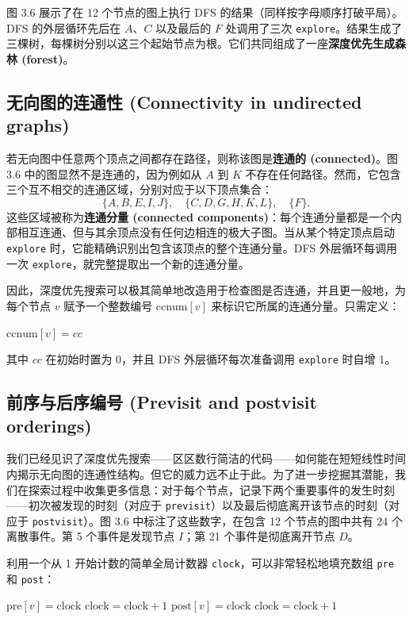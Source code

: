 图 3.6 展示了在 12 个节点的图上执行 DFS 的结果（同样按字母顺序打破平局）。DFS 的外层循环先后在 $A$、$C$ 以及最后的 $F$ 处调用了三次 \texttt{explore}。结果生成了三棵树，每棵树分别以这三个起始节点为根。它们共同组成了一座\textbf{深度优先生成森林 (forest)}。

\subsection{无向图的连通性 (Connectivity in undirected graphs)}
若无向图中任意两个顶点之间都存在路径，则称该图是\textbf{连通的 (connected)}。图 3.6 中的图显然不是连通的，因为例如从 $A$ 到 $K$ 不存在任何路径。然而，它包含三个互不相交的连通区域，分别对应于以下顶点集合：
\[
\{A, B, E, I, J\}, \quad \{C, D, G, H, K, L\}, \quad \{F\}.
\]
这些区域被称为\textbf{连通分量 (connected components)}：每个连通分量都是一个内部相互连通、但与其余顶点没有任何边相连的极大子图。当从某个特定顶点启动 \texttt{explore} 时，它能精确识别出包含该顶点的整个连通分量。DFS 外层循环每调用一次 \texttt{explore}，就完整提取出一个新的连通分量。

因此，深度优先搜索可以极其简单地改造用于检查图是否连通，并且更一般地，为每个节点 $v$ 赋予一个整数编号 $\text{ccnum}[v]$ 来标识它所属的连通分量。只需定义：
\begin{algorithmic}[1]
    \State $\text{ccnum}[v] = cc$
\EndProcedure
\end{algorithmic}
其中 $cc$ 在初始时置为 0，并且 DFS 外层循环每次准备调用 \texttt{explore} 时自增 1。

\subsection{前序与后序编号 (Previsit and postvisit orderings)}
我们已经见识了深度优先搜索——区区数行简洁的代码——如何能在短短线性时间内揭示无向图的连通性结构。但它的威力远不止于此。为了进一步挖掘其潜能，我们在探索过程中收集更多信息：对于每个节点，记录下两个重要事件的发生时刻——初次被发现的时刻（对应于 \texttt{previsit}）以及最后彻底离开该节点的时刻（对应于 \texttt{postvisit}）。图 3.6 中标注了这些数字，在包含 12 个节点的图中共有 24 个离散事件。第 5 个事件是发现节点 $I$；第 21 个事件是彻底离开节点 $D$。

利用一个从 1 开始计数的简单全局计数器 \texttt{clock}，可以非常轻松地填充数组 \texttt{pre} 和 \texttt{post}：
\begin{algorithmic}[1]
    \State $\text{pre}[v] = \text{clock}$
    \State $\text{clock} = \text{clock} + 1$
\EndProcedure
{}
    \State $\text{post}[v] = \text{clock}$
    \State $\text{clock} = \text{clock} + 1$
\EndProcedure
\end{algorithmic}

